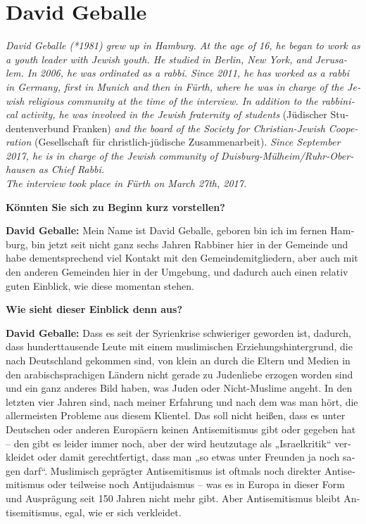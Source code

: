 \section{David Geballe} 
\begin{otherlanguage}{ngerman}
\textit{David Geballe (*1981) grew up in Hamburg. At the age of 16, he began to work as a youth leader with Jewish youth. He studied in Berlin, New York, and Jerusalem. In 2006, he was ordinated as a rabbi. Since 2011, he has worked as a rabbi in Germany, first in Munich and then in Fürth, where he was in charge of the Jewish religious community at the time of the interview. In addition to the rabbinical activity, he was involved in the Jewish fraternity of students} (Jüdischer Studentenverbund Franken) \textit{and the board of the Society for Christian-Jewish Cooperation} (Gesellschaft für christlich-jüdische Zusammenarbeit). \textit{Since September 2017, he is in charge of the Jewish community of Duisburg-Mülheim/Ruhr-Oberhausen as Chief Rabbi.\\
The interview took place in Fürth on March 27th, 2017.}\par
\vspace*{2em}
\textbf{Könnten Sie sich zu Beginn kurz vorstellen?} 

\textbf{David Geballe:} Mein Name ist David Geballe, geboren bin ich im fernen Hamburg, bin jetzt seit nicht ganz sechs Jahren Rabbiner hier in der Gemeinde und habe dementsprechend viel Kontakt mit den Gemeindemitgliedern, aber auch mit den anderen Gemeinden hier in der Umgebung, und dadurch auch einen relativ guten Einblick, wie diese momentan stehen. 

\textbf{Wie sieht dieser Einblick denn aus?} 

\textbf{David Geballe:} Dass es seit der Syrienkrise schwieriger geworden ist, dadurch, dass hunderttausende Leute mit einem muslimischen Erziehungshintergrund, die nach Deutschland gekommen sind, von klein an durch die Eltern und Medien in den arabischsprachigen Ländern nicht gerade zu Judenliebe erzogen worden sind und ein ganz anderes Bild haben, was Juden oder Nicht-Muslime angeht. In den letzten vier Jahren sind, nach meiner Erfahrung und nach dem was man hört, die allermeisten Probleme aus diesem Klientel. Das soll nicht heißen, dass es unter Deutschen oder anderen Europäern keinen Antisemitismus gibt oder gegeben hat – den gibt es leider immer noch, aber der wird heutzutage als „Israelkritik“ verkleidet oder damit gerechtfertigt, dass man „so etwas unter Freunden ja noch sagen darf“. Muslimisch geprägter Antisemitismus ist oftmals noch direkter Antisemitismus oder teilweise noch Antijudaismus – was es in Europa in dieser Form und Ausprägung seit 150 Jahren nicht mehr gibt. Aber Antisemitismus bleibt Antisemitismus, egal, wie er sich verkleidet. 


\end{otherlanguage}
